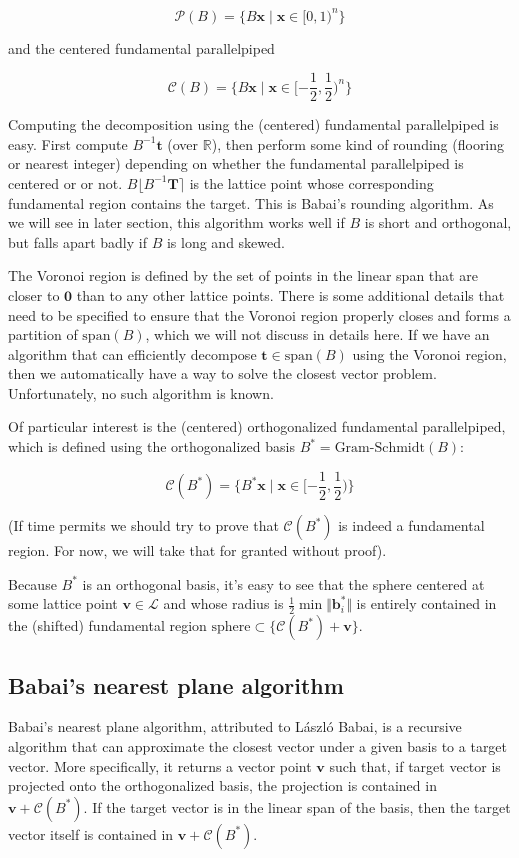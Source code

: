\documentclass[letterpaper,12pt]{article}
\begin{document}
$$
\mathcal{P}(B) = \{B\mathbf{x} \mid \mathbf{x} \in [0, 1)^n\}
$$

and the centered fundamental parallelpiped

$$
\mathcal{C}(B) = \{B\mathbf{x} \mid \mathbf{x} \in [-\frac{1}{2}, \frac{1}{2})^n\}
$$

Computing the decomposition using the (centered) fundamental parallelpiped is easy. First compute $B^{-1}\mathbf{t}$ (over $\mathbb{R}$), then perform some kind of rounding (flooring or nearest integer) depending on whether the fundamental parallelpiped is centered or or not. $B\lfloor B^{-1}\mathbf{T} \rceil$ is the lattice point whose corresponding fundamental region contains the target. This is Babai's rounding algorithm. As we will see in later section, this algorithm works well if $B$ is short and orthogonal, but falls apart badly if $B$ is long and skewed.

The Voronoi region is defined by the set of points in the linear span that are closer to $\mathbf{0}$ than to any other lattice points. There is some additional details that need to be specified to ensure that the Voronoi region properly closes and forms a partition of $\text{span}(B)$, which we will not discuss in details here. If we have an algorithm that can efficiently decompose $\mathbf{t} \in \text{span}(B)$ using the Voronoi region, then we automatically have a way to solve the closest vector problem. Unfortunately, no such algorithm is known.

Of particular interest is the (centered) orthogonalized fundamental parallelpiped, which is defined using the orthogonalized basis $B^\ast = \text{Gram-Schmidt}(B)$:

$$
\mathcal{C}(B^\ast) = \{B^\ast\mathbf{x} \mid \mathbf{x} \in [-\frac{1}{2}, \frac{1}{2})\}
$$

(If time permits we should try to prove that $\mathcal{C}(B^\ast)$ is indeed a fundamental region. For now, we will take that for granted without proof).

Because $B^\ast$ is an orthogonal basis, it's easy to see that the sphere centered at some lattice point $\mathbf{v} \in \mathcal{L}$ and whose radius is $\frac{1}{2}\min \Vert \mathbf{b}_i^\ast\Vert$ is entirely contained in the (shifted) fundamental region $\text{sphere} \subset \{\mathcal{C}(B^\ast) + \mathbf{v}\}$.

\subsection{Babai's nearest plane algorithm}
Babai's nearest plane algorithm, attributed to László Babai, is a recursive algorithm that can approximate the closest vector under a given basis to a target vector. More specifically, it returns a vector point $\mathbf{v}$ such that, if target vector is projected onto the orthogonalized basis, the projection is contained in $\mathbf{v} + \mathcal{C}(B^\ast)$. If the target vector is in the linear span of the basis, then the target vector itself is contained in $\mathbf{v} + \mathcal{C}(B^\ast)$.
\end{document}
